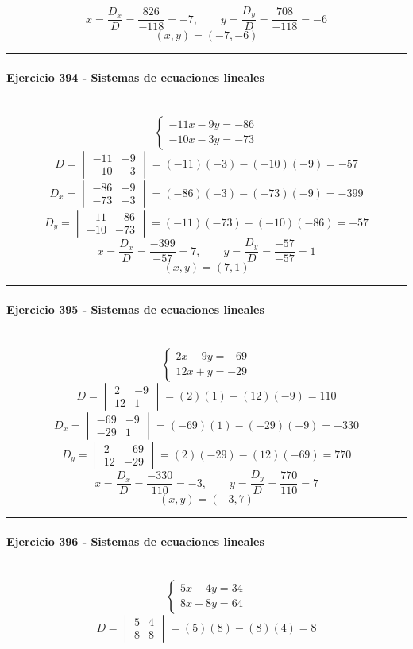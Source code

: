 \documentclass[10pt,a4paper]{article}
\newcommand{\res}[1]{\paragraph{#1}\mbox{}\\[-1.2em]}
\begin{document}
\[ x=\frac{D_x}{D}=\frac{826}{-118}=-7,\qquad y=\frac{D_y}{D}=\frac{708}{-118}=-6 \]
\[ \boxed{(x,y)=(-7,-6)} \]
\vspace{1mm}\hrule\vspace{2mm}
\res{Ejercicio 394 - Sistemas de ecuaciones lineales}
\[ \begin{cases}- 11 x - 9 y=-86\\- 10 x - 3 y=-73\end{cases} \]
\[ D=\begin{vmatrix}-11&-9\\-10&-3\end{vmatrix}=(-11)(-3)-(-10)(-9)=-57 \]
\[ D_x=\begin{vmatrix}-86&-9\\-73&-3\end{vmatrix}=(-86)(-3)-(-73)(-9)=-399 \]
\[ D_y=\begin{vmatrix}-11&-86\\-10&-73\end{vmatrix}=(-11)(-73)-(-10)(-86)=-57 \]
\[ x=\frac{D_x}{D}=\frac{-399}{-57}=7,\qquad y=\frac{D_y}{D}=\frac{-57}{-57}=1 \]
\[ \boxed{(x,y)=(7,1)} \]
\vspace{1mm}\hrule\vspace{2mm}
\res{Ejercicio 395 - Sistemas de ecuaciones lineales}
\[ \begin{cases}2 x - 9 y=-69\\12 x + y=-29\end{cases} \]
\[ D=\begin{vmatrix}2&-9\\12&1\end{vmatrix}=(2)(1)-(12)(-9)=110 \]
\[ D_x=\begin{vmatrix}-69&-9\\-29&1\end{vmatrix}=(-69)(1)-(-29)(-9)=-330 \]
\[ D_y=\begin{vmatrix}2&-69\\12&-29\end{vmatrix}=(2)(-29)-(12)(-69)=770 \]
\[ x=\frac{D_x}{D}=\frac{-330}{110}=-3,\qquad y=\frac{D_y}{D}=\frac{770}{110}=7 \]
\[ \boxed{(x,y)=(-3,7)} \]
\vspace{1mm}\hrule\vspace{2mm}
\res{Ejercicio 396 - Sistemas de ecuaciones lineales}
\[ \begin{cases}5 x + 4 y=34\\8 x + 8 y=64\end{cases} \]
\[ D=\begin{vmatrix}5&4\\8&8\end{vmatrix}=(5)(8)-(8)(4)=8 \]
\end{document}
